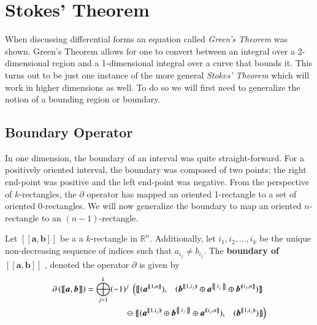 

%
%
\section{Stokes' Theorem}

When discussing differential forms an equation called \emph{Green's Theorem} was shown. 
Green's Theorem allows for one to convert between an integral over a 2-dimensional region and a 1-dimensional integral
over a curve that bounds it.
This turns out to be just one instance of the more general \emph{Stokes' Theorem} 
which will work in higher dimensions as well.
To do so we will first need to generalize the notion of a bounding region or boundary.



\subsection{Boundary Operator}


In one dimension, the boundary of an interval was quite straight-forward.
For a positively oriented interval, the boundary was composed of two points; 
the right end-point was positive and the left end-point was negative.
From the perspective of $k$-rectangles, 
the $\partial$ operator has mapped an oriented 1-rectangle to a set of oriented 0-rectangles.
We will now generalize the boundary to map an oriented $n$-rectangle to an $(n-1)$-rectangle.


\begin{definition}
	Let  $[\![\boldsymbol{a}, \boldsymbol{b}]\!]$ be a a $k$-rectangle in $\mathbb{R}^n$.
	Additionally, let $i_1, i_2, \ldots, i_k$ be the unique non-decreasing sequence of indices such that $a_{i_j} \neq b_{i_j}$.
	The \textbf{boundary of $ \boldsymbol{[\![ a,b ]\!]} $ }, denoted the operator $\partial$ is given by
	\begin{align}
		\partial \left( [\![ \boldsymbol{a}, \boldsymbol{b} ]\!] \right) 
		= \bigoplus_{j=1}^k (-1)^j \;
			\left(	
				[\![ 	(\boldsymbol{a}^{[\![1,n]\!]}), 
					\;\;\;
					(\boldsymbol{b}^{[\![1,i_j)\!)} 
						\oplus \boldsymbol{a}^{\hset{i_j}}
						\oplus \boldsymbol{b}^{(\!(i_j,n]\!]}) 
				]\!] \right.\;
			\notag\\
			\ominus \left.
				[\![ 	(\boldsymbol{a}^{[\![1,i_j)\!)}
						\oplus \boldsymbol{b}^{\hset{i_j}}
						\oplus \boldsymbol{a}^{(\!(i_j, n]\!]}), 
					\;\;\;		 
					(\boldsymbol{b}^{[\![1,i_j)\!)}) 			
				]\!]
			\right)
	\end{align}
\end{definition}


